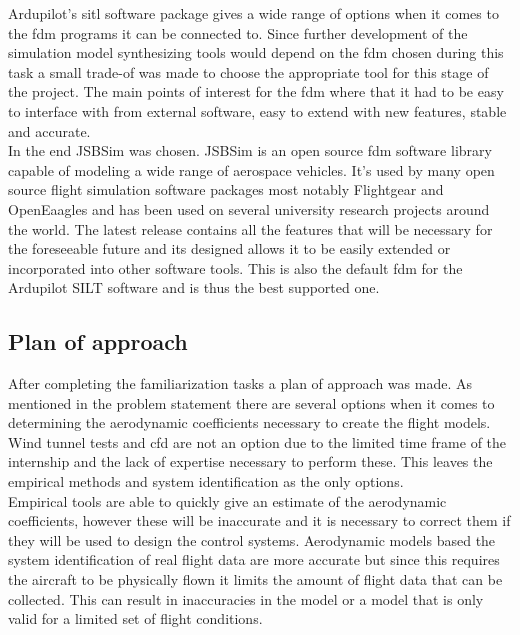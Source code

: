 Ardupilot's \gls{sitl} software package gives a wide range of options when it comes to the \gls{fdm} programs it can be connected to. Since further development of the simulation model synthesizing tools would depend on the \gls{fdm} chosen during this task a small trade-of was made to choose the appropriate tool for this stage of the project. The main points of interest for the \gls{fdm} where that it had to be easy to interface with from external software, easy to extend with new features, stable and accurate. \\

In the end JSBSim was chosen. JSBSim is an open source \gls{fdm} software library capable of modeling a wide range of aerospace vehicles. It's used by many open source flight simulation software packages most notably Flightgear and OpenEaagles and has been used on several university research projects around the world. The latest release contains all the features that will be necessary for the foreseeable future and its designed allows it to be easily extended or incorporated into other software tools. This is also the default \gls{fdm} for the Ardupilot SILT software and is thus the best supported one.

\subsection{Plan of approach}
After completing the familiarization tasks a plan of approach was made. As mentioned in the problem statement there are several options when it comes to determining the aerodynamic coefficients necessary to create the flight models. Wind tunnel tests and \gls{cfd} are not an option due to the limited time frame of the internship and the lack of expertise necessary to perform these. This leaves the empirical methods and system identification as the only options. \\

Empirical tools are able to quickly give an estimate of the aerodynamic coefficients, however these will be inaccurate and it is necessary to correct them if they will be used to design the control systems. Aerodynamic models based the system identification of real flight data are more accurate but since this requires the aircraft to be physically flown it limits the amount of flight data that can be collected. This can result in inaccuracies in the model or a model that is only valid for a limited set of flight conditions. \\

